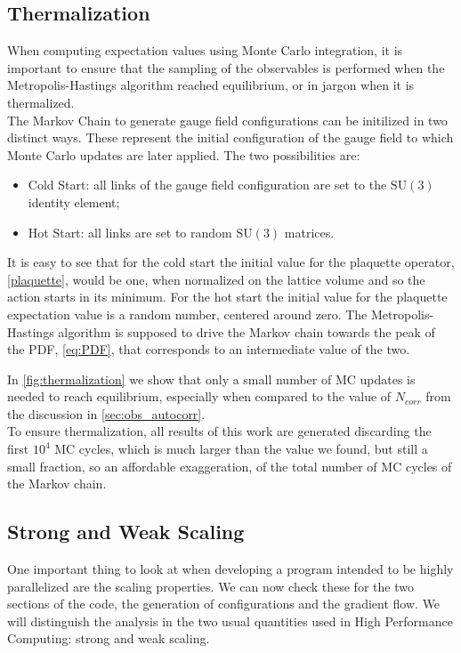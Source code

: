 \subsection{Thermalization}
\label{sec:thermalization}
When computing expectation values using Monte Carlo integration, it is important to ensure that the sampling of the observables is performed when the Metropolis-Hastings algorithm reached equilibrium, or in jargon when it is thermalized.\\
The Markov Chain to generate gauge field configurations can be initilized in two distinct ways. These represent the initial configuration of the gauge field to which Monte Carlo updates are later applied. The two possibilities are:
\begin{itemize} 
    \item Cold Start: all links of the gauge field configuration are set to the $\mathrm{SU}(3)$ identity element;
    \item Hot Start: all links are set to random $\mathrm{SU}(3)$ matrices.
\end{itemize}
It is easy to see that for the cold start the initial value for the plaquette operator, \cref{plaquette}, would be one, when normalized on the lattice volume and so the action starts in its minimum. For the hot start the initial value for the plaquette expectation value is a random number, centered around zero. The Metropolis-Hastings algorithm is supposed to drive the Markov chain towards the peak of the PDF, \cref{eq:PDF}, that corresponds to an intermediate value of the two. \\

In \cref{fig:thermalization} we show that only a small number of MC updates is needed to reach equilibrium, especially when compared to the value of $N_{corr}$ from the discussion in \cref{sec:obs_autocorr}. \\
To ensure thermalization, all results of this work are generated discarding the first $10^4$ MC cycles, which is much larger than the value we found, but still a small fraction, so an affordable exaggeration, of the total number of MC cycles of the Markov chain.

\subsection{Strong and Weak Scaling}
One important thing to look at when developing a program intended to be highly parallelized are the scaling properties. We can now check these for the two sections of the code, the generation of configurations and the gradient flow. We will distinguish the analysis in the two usual quantities used in High Performance Computing: strong and weak scaling. \\
